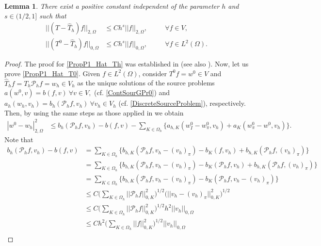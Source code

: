 \documentclass[final,reqno]{elsarticle}
\newtheorem{lemma}{Lemma}[section]
\def\LO{L^2(\O)}
\def\O{\Omega}
\def\LO{L^2(\Omega)}
\begin{document}
\begin{lemma}\label{Lema4.11}
There exist a positive constant independent of the parameter $h$ and $s\in (1/2,1]$ such that
\begin{subequations}
\begin{alignat}{2}
|| ( T-\widehat{T}_h)f||_{2,\Omega}&\leq Ch^s || f||_{2,\O}, && \quad \forall f\in V,\label{PropP1_Hat_Th}\\
|| ( T^0-\widehat{T}_h)f||_{0,\O}&\leq Ch^s || f||_{0,\O}, && \quad \forall f\in \LO\label{PropP1_Hat_T0}.
\end{alignat}
\end{subequations}
\end{lemma}
\begin{proof}
The proof for \eqref{PropP1_Hat_Th} was established in \cite{MRV2018} (see also \cite[Proposition~5]{DV_camwa2022}). Now, let us prove \eqref{PropP1_Hat_T0}. Given $f\in\LO$, consider $T^0f=w^0\in   V  $ and $\widehat{T}_hf=T_h\mathcal{P}_hf=w_h\in  V_h  $ as the unique solutions of the source problems $a(w^0,v)=b(f,v) \ \forall v\in   V,$ (cf. \eqref{ContSourGPr0}) and $a_h(w_h,v_h)=b_h(\mathcal{P}_hf,v_h)\ \forall v_h\in  V_h $ (cf. \eqref{DiscreteSourceProblem}), respectively. Then, by using the same steps as those applied in \cite[Theorem~5.1]{DV_camwa2022} we obtain 
\begin{align}
|w^0-w_h|_{2,\O}^2&\leq b_h(\mathcal{P}_hf,v_h)-b(f,v)-\sum\limits_{K\in \Omega_h} \Big\{ a_{h,K}(w_I^0-w_{\pi}^0,v_h) +a_K(w_{\pi}^0-w^0,v_h) \Big\}\label{conv_L2_1}.
\end{align}
%
Note that
%
\begin{align}
b_h(\mathcal{P}_hf,v_h)-b(f,v)&=\sum\limits_{K\in \Omega_h} \Big\{b_{h,K}(\mathcal{P}_hf,v_h- (v_h)_{\pi} )-b_K(f,v_h)+b_{h,K}(\mathcal{P}_hf, (v_h)_{\pi} ) \Big\}\nonumber\\
&=\sum\limits_{K\in \Omega_h} \Big\{b_{h,K}(\mathcal{P}_hf,v_h- (v_h)_{\pi} )-b_K(\mathcal{P}_hf,v_h)+b_{h,K}(\mathcal{P}_hf, (v_h)_{\pi} ) \Big\}\nonumber\\
&=\sum\limits_{K\in \Omega_h} \Big\{b_{h,K}(\mathcal{P}_hf,v_h- (v_h)_{\pi} )-b_K(\mathcal{P}_hf,v_h- (v_h)_{\pi} ) \Big\}\nonumber\\
&\leq C\Big(\sum\limits_{K\in \Omega_h} ||\mathcal{P}_hf ||_{0,K}^2\Big)^{1/2}\Big(||v_h- (v_h)_{\pi}  ||_{0,K}^2\Big)^{1/2}\nonumber\\
&\leq C\Big(\sum\limits_{K\in \Omega_h} ||\mathcal{P}_hf ||_{0,K}^2\Big)^{1/2}h^2||v_h ||_{0,\O}\nonumber\\
&\leq Ch^2\Big(\sum\limits_{K\in \Omega_h} ||f ||_{0,K}^2\Big)^{1/2}||v_h ||_{0,\O}\nonumber\\

\end{align}
\end{proof}
\end{document}

